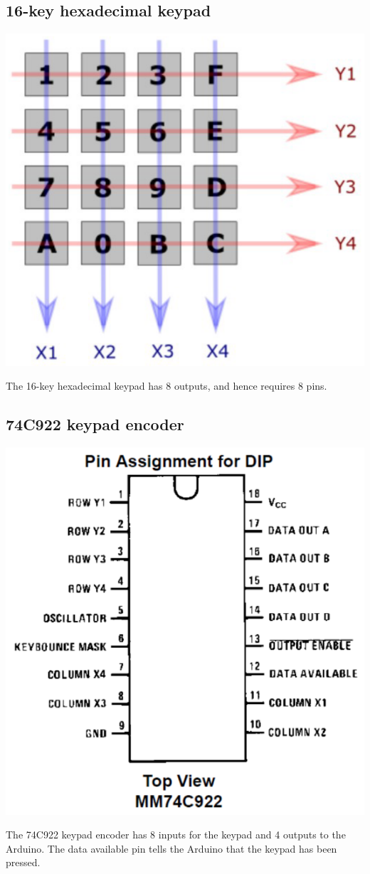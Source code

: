 \documentclass[11pt]{article}
\begin{document}
\subsection{16-key hexadecimal keypad}
\label{sec:org2595c34}
\begin{center}
\includegraphics[width=.9\linewidth]{./images/16-key-hexadecimal-keypad.png}
\end{center}
The 16-key hexadecimal keypad has 8 outputs, and hence requires 8 pins.
\subsection{74C922 keypad encoder}
\label{sec:org75805cc}
\begin{center}
\includegraphics[width=.9\linewidth]{./images/74c922-keypad-encoder.png}
\end{center}
The 74C922 keypad encoder has 8 inputs for the keypad and 4 outputs to the Arduino. The data available pin tells the Arduino that the keypad has been pressed.
\end{document}
